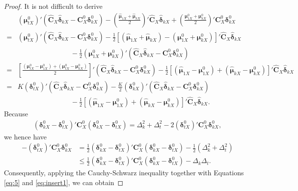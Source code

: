 \documentclass[12pt]{article}
\begin{document}
\begin{proof}{}{}
It is not difficult to derive
\begin{align*}
& (\bm \mu_{tX}^0)' (\hat{\bm C}_X \hat{\bm \delta}_{kX} - \bm C_X^0 \bm \delta_{kX}^0) - (\frac{\hat{\bm \mu}_{1X} + \hat{\bm \mu}_{kX}}{2})' \hat{\bm C}_X \hat{\bm \delta}_{kX} + (\frac{\bm \mu_{1X}^0 + \bm \mu_{kX}^0}{2})' \bm C_X^0 \bm \delta_{kX}^0  \\
=& (\bm \mu_{tX}^0)' (\hat{\bm C}_X \hat{\bm \delta}_{kX} - \bm C_X^0 \bm \delta_{kX}^0) - \frac{1}{2} [(\hat{\bm \mu}_{1X} + \hat{\bm \mu}_{kX}) - (\bm \mu_{1X}^0 + \bm \mu_{kX}^0)]' \hat{\bm C}_X \hat{\bm \delta}_{kX} \\
&~~~~~~~~~~~~~~~~~~~~~~~~~~~~~~~~~~~ - \frac{1}{2} (\bm \mu_{1X}^0 + \bm \mu_{kX}^0)' (\hat{\bm C}_X \hat{\bm \delta}_{kX} - \bm C_X^0 \bm \delta_{kX}^0)    \\
=& [\frac{(\bm \mu_{tX}^0 - \bm \mu_{1X}^0) + (\bm \mu_{tX}^0 - \bm \mu_{kX}^0)}{2}]' (\hat{\bm C}_X \hat{\bm \delta}_{kX} - \bm C_X^0 \bm \delta_{kX}^0) - \frac{1}{2} [(\hat{\bm \mu}_{1X} - \bm \mu_{1X}^0) + (\hat{\bm \mu}_{kX} - \bm \mu_{kX}^0)]' \hat{\bm C}_X \hat{\bm \delta}_{kX}   \\
=& K (\bm \delta_{tX}^0)' (\hat{\bm C}_X \hat{\bm \delta}_{kX} - \bm C_X^0 \bm \delta_{kX}^0) - \frac{K}{2} (\bm \delta_{kX}^0)' (\hat{\bm C}_X \hat{\bm \delta}_{kX} - \bm C_X^0 \bm \delta_{kX}^0) \\
&~~~~~~~~~~~~~~~~~~~~~~~~~~~~~~~~~~~ - \frac{1}{2} [(\hat{\bm \mu}_{1X} - \bm \mu_{1X}^0) + (\hat{\bm \mu}_{kX} - \bm \mu_{kX}^0)]' \hat{\bm C}_X \hat{\bm \delta}_{kX}.
\end{align*}
Because
\begin{align*}
(\bm \delta_{kX}^0 - \bm \delta_{tX}^0)' \bm C_X^0 (\bm \delta_{kX}^0 - \bm \delta_{tX}^0) = \Delta_k^2 + \Delta_t^2 - 2 (\bm \delta_{tX}^0)' \bm C_X^0 \bm \delta_{kX}^0,
\end{align*}
we hence have
\begin{align*}
- (\bm \delta_{tX}^0)' \bm C_X^0 \bm \delta_{kX}^0 &= \frac{1}{2} (\bm \delta_{kX}^0 - \bm \delta_{tX}^0)' \bm C_X^0 (\bm \delta_{kX}^0 - \bm \delta_{tX}^0) - \frac{1}{2} (\Delta_k^2 + \Delta_t^2)  \\
& \leq \frac{1}{2} (\bm \delta_{kX}^0 - \bm \delta_{tX}^0)' \bm C_X^0 (\bm \delta_{kX}^0 - \bm \delta_{tX}^0) - \Delta_k \Delta_t.
\end{align*}
Consequently, applying the Cauchy-Schwarz inequality together with Equations \eqref{eq:5} and \eqref{eq:insert1}, we can obtain

\end{proof}
\end{document}
